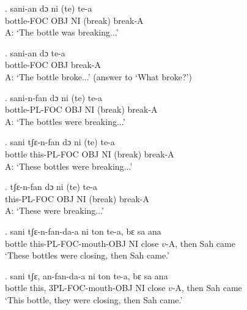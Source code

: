 \documentclass{assets/fieldnotes}
\begin{document}
\exg.
sani-an      dɔ    ni   (te)      te-a    \\
bottle-FOC   OBJ   NI   (break)   break-A \\%
A: `The bottle was breaking...' \label{67927}


\exg.
sani-an      dɔ    te-a    \\
bottle-FOC   OBJ   break-A \\%
A: `The bottle broke...' (answer to `What broke?')

\exg.
sani-n-fan      dɔ    ni   (te)      te-a    \\
bottle-PL-FOC   OBJ   NI   (break)   break-A \\%
A: `The bottles were breaking...' \label{42653}

\exg.
sani     tʃɛ-n-fan     dɔ    ni   (te)      te-a    \\
bottle   this-PL-FOC   OBJ   NI   (break)   break-A \\%
A: `These bottles were breaking...'

\exg.
tʃɛ-n-fan     dɔ    ni   (te)      te-a    \\
this-PL-FOC   OBJ   NI   (break)   break-A \\%
A: `These were breaking...' \label{27512}

\exg.
sani     tʃɛ-n-fan-da-a          ni   ton     te-a,    bɛ     sa    ana  \\
bottle   this-PL-FOC-mouth-OBJ   NI   close   $v$-A,   then   Sah   came \\%
`These bottles were closing, then Sah came.' \label{34876}


\exg.
sani     tʃɛ,    an-fan-da-a         ni   ton     te-a,    bɛ     sa    ana  \\
bottle   this,   3PL-FOC-mouth-OBJ   NI   close   $v$-A,   then   Sah   came \\%
`This bottle, they were closing, then Sah came.' \label{42253}
\end{document}
